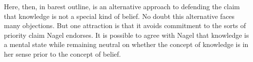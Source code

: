 \documentclass[11pt,a4paper]{extarticle}
\begin{document}
Here, then, in barest outline, is an alternative approach to defending the claim that knowledge is not a special kind of belief.
No doubt this alternative faces many objections.
But one attraction is that it avoids commitment to the sorts of priority claim Nagel endorses.
It is possible to agree with Nagel that knowledge is a mental state while remaining neutral on whether the concept of knowledge is in her sense prior to the concept of belief.






\end{document}
